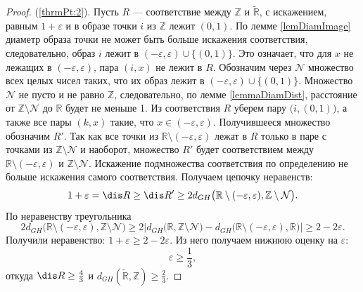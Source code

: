 \begin{proof}
  (\ref{thrmPt:2}).
  Пусть $R$ --- соответствие
  между $\mathbb{Z}$ и $\widetilde{\mathbb{R}}$, с искажением,
  равным $1 + \varepsilon$ и
  в образе точки $i$ из $\mathbb{Z}$ лежит $(0,1)$. По лемме
  \ref{lemDiamImage} диаметр
  образа точки не может быть больше искажения соответствия,
  следовательно, образ $i$ лежит в $(-\varepsilon, \varepsilon) \cup
  \bigl\{(0,1)\bigr\}$. Это
  означает, что для
  $x$ не лежащих в $(-\varepsilon, \varepsilon)$, пара $(i, x)$ не лежит в $R$.
  Обозначим через $\mathcal{N}$ множество всех целых чисел таких, что их
  образ лежит в $(-\varepsilon, \varepsilon) \cup
  \bigl\{(0,1)\bigr\}$. Множество
  $\mathcal{N}$ не пусто и не равно $\mathbb{Z}$, следовательно, по
  лемме \ref{lemmaDiamDist},
  расстояние от $\mathbb{Z} \setminus\mathcal{N}$ до $\mathbb{R}$ будет не
  меньше 1.
  Из соответствия $R$ уберем пару $\bigl(i,(0,1)\bigr)$, а также
  все пары $(k,x)$ такие, что $x \in  (-\varepsilon, \varepsilon)$.
  Получившееся множество обозначим $R'$.
  Так как все точки из $\mathbb{R}\setminus(-\varepsilon,
  \varepsilon)$ лежат в $R$
  только в паре с точками из $ \mathbb{Z} \setminus\mathcal{N}$ и наоборот,
  множество $R'$ будет соответствием между
  $\mathbb{R}\setminus(-\varepsilon, \varepsilon)$ и
  $ \mathbb{Z} \setminus\mathcal{N}$. Искажение
  подмножества соответствия по определению не больше искажения
  самого соответствия. Получаем цепочку неравенств:
  \[1+\varepsilon = \dis R \ge \dis R' \ge
    2d_{GH}\bigl(\mathbb{R}\setminus(-\varepsilon, \varepsilon), \mathbb{Z}
  \setminus \mathcal{N}\bigr).\]
  По неравенству треугольника
  \[
    2d_{GH}\bigl(\mathbb{R}\setminus(-\varepsilon, \varepsilon), \mathbb{Z}
    \setminus \mathcal{N}\bigr) \ge
    2\Big|d_{GH}\bigl(\mathbb{R}, \mathbb{Z} \setminus
    \mathcal{N}\bigr) - d_{GH}\bigl(\mathbb{R}\setminus(-\varepsilon,
    \varepsilon), \mathbb{R}\bigr)\Big| \ge 2 - 2\varepsilon.
  \]
  Получили неравенство: $1 + \varepsilon \ge 2 - 2\varepsilon$.
  Из него получаем нижнюю оценку на $\varepsilon$:
  \[\varepsilon \ge \frac 1 3,\]
  откуда $\dis R \ge \frac 4 3$ и
  $d_{GH}\left(\widetilde{\mathbb{R}}, \mathbb{Z}\right) \ge \frac 2
  3 $.
\end{proof}
